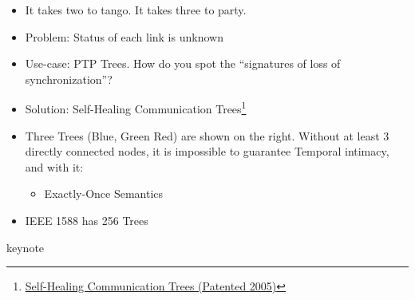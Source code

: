 \documentclass[../HFT-main.tex]{subfiles}
\begin{document}
\begin{itemize}
\item It takes two to tango. It takes three to party.
\item Problem: Status of each link is unknown
\item Use-case: PTP Trees. How do you spot the ``signatures of loss of synchronization''?
\item Solution:  Self-Healing Communication Trees\footnote{\href{https://patentimages.storage.googleapis.com/26/12/fc/a9cee5d1bf69ca/WO2010078506A1.pdf}{Self-Healing Communication Trees (Patented 2005)}}
\item Three Trees (Blue, Green Red) are shown on the right.  Without at least 3 directly connected nodes, it is impossible to guarantee Temporal intimacy, and with it:
	\begin{itemize}
	\item Exactly-Once Semantics
	\end{itemize}
\item IEEE 1588 has 256 Trees
\end{itemize}
keynote
\end{document}
